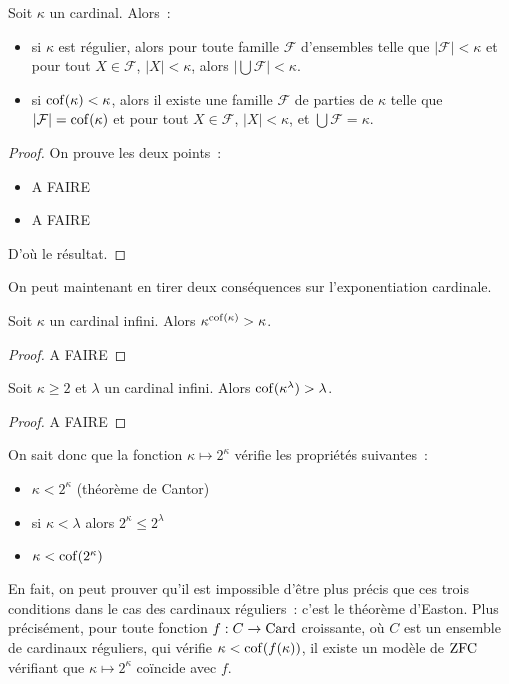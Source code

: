 \begin{theorem}[König]\label{thm.Konig}
  Soit $\kappa$ un cardinal. Alors~:
  \begin{itemize}
  \item si $\kappa$ est régulier, alors pour toute famille $\mathcal F$
    d'ensembles telle que $|\mathcal F| < \kappa$ et pour tout $X\in\mathcal F$,
    $|X| < \kappa$, alors $\displaystyle\Big|\bigcup \mathcal F\Big| < \kappa$.
  \item si $\operatorname{cof}(\kappa) < \kappa$, alors il existe une famille $\mathcal F$
    de parties de $\kappa$ telle que $|\mathcal F| = \operatorname{cof}(\kappa)$ et pour tout
    $X\in\mathcal F$, $|X|<\kappa$, et $\displaystyle\bigcup\mathcal F =\kappa$.
  \end{itemize}
\end{theorem}

\begin{proof}
  On prouve les deux points~:
  \begin{itemize}
  \item A FAIRE
  \item A FAIRE
  \end{itemize}
  D'où le résultat.
\end{proof}

On peut maintenant en tirer deux conséquences sur l'exponentiation cardinale.

\begin{proposition}
  Soit $\kappa$ un cardinal infini. Alors $\kappa^{\operatorname{cof}(\kappa)} > \kappa$.
\end{proposition}

\begin{proof}
  A FAIRE
\end{proof}

\begin{theorem}
  Soit $\kappa \geq 2$ et $\lambda$ un cardinal infini. Alors
  $\operatorname{cof}(\kappa^\lambda) > \lambda$.
\end{theorem}

\begin{proof}
  A FAIRE
\end{proof}

On sait donc que la fonction $\kappa \mapsto 2^\kappa$ vérifie les propriétés
suivantes~:
\begin{itemize}
\item $\kappa < 2^\kappa$ (théorème de Cantor)
\item si $\kappa < \lambda$ alors $2^\kappa \leq 2^\lambda$
\item $\kappa < \operatorname{cof}(2^\kappa)$
\end{itemize}

En fait, on peut prouver qu'il est impossible d'être plus précis que ces trois
conditions dans le cas des cardinaux réguliers~: c'est le théorème d'Easton.
Plus précisément, pour toute fonction $f : C \to \operatorname{Card}$ croissante, où $C$ est
un ensemble de cardinaux réguliers, qui vérifie $\kappa < \operatorname{cof}(f(\kappa))$, il
existe un modèle de $\operatorname{ZFC}$ vérifiant que $\kappa \mapsto 2^\kappa$ coïncide avec
$f$.
